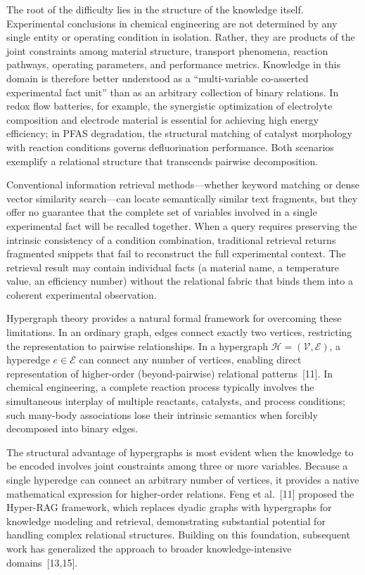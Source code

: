 \documentclass[11pt,a4paper]{article}
\begin{document}
The root of the difficulty lies in the structure of the knowledge itself. Experimental conclusions in chemical engineering are not determined by any single entity or operating condition in isolation. Rather, they are products of the joint constraints among material structure, transport phenomena, reaction pathways, operating parameters, and performance metrics. Knowledge in this domain is therefore better understood as a ``multi-variable co-asserted experimental fact unit'' than as an arbitrary collection of binary relations. In redox flow batteries, for example, the synergistic optimization of electrolyte composition and electrode material is essential for achieving high energy efficiency; in PFAS degradation, the structural matching of catalyst morphology with reaction conditions governs defluorination performance. Both scenarios exemplify a relational structure that transcends pairwise decomposition.

Conventional information retrieval methods---whether keyword matching or dense vector similarity search---can locate semantically similar text fragments, but they offer no guarantee that the complete set of variables involved in a single experimental fact will be recalled together. When a query requires preserving the intrinsic consistency of a condition combination, traditional retrieval returns fragmented snippets that fail to reconstruct the full experimental context. The retrieval result may contain individual facts (a material name, a temperature value, an efficiency number) without the relational fabric that binds them into a coherent experimental observation.

Hypergraph theory provides a natural formal framework for overcoming these limitations. In an ordinary graph, edges connect exactly two vertices, restricting the representation to pairwise relationships. In a hypergraph $\mathcal{H}=(\mathcal{V},\mathcal{E})$, a hyperedge $e \in \mathcal{E}$ can connect any number of vertices, enabling direct representation of higher-order (beyond-pairwise) relational patterns~[11]. In chemical engineering, a complete reaction process typically involves the simultaneous interplay of multiple reactants, catalysts, and process conditions; such many-body associations lose their intrinsic semantics when forcibly decomposed into binary edges.

The structural advantage of hypergraphs is most evident when the knowledge to be encoded involves joint constraints among three or more variables. Because a single hyperedge can connect an arbitrary number of vertices, it provides a native mathematical expression for higher-order relations. Feng et al.~[11] proposed the Hyper-RAG framework, which replaces dyadic graphs with hypergraphs for knowledge modeling and retrieval, demonstrating substantial potential for handling complex relational structures. Building on this foundation, subsequent work has generalized the approach to broader knowledge-intensive domains~[13,15].
\end{document}
